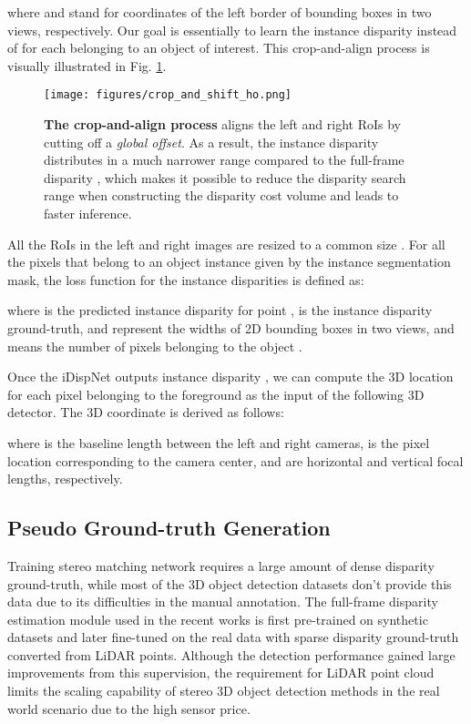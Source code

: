\documentclass[10pt,twocolumn,letterpaper]{article}
\begin{document}
where  and  stand for coordinates of the left border of bounding boxes in two views, respectively. Our goal is essentially to learn the instance disparity  instead of  for each  belonging to an object of interest. This crop-and-align process is visually illustrated in Fig. \ref{fig:crop_and_shift}.
\begin{figure}[tb]
    \centering
    \texttt{[image: figures/crop\_and\_shift\_ho.png]}
    \caption{
        \textbf{The crop-and-align process} aligns the left and right RoIs by cutting off a \textit{global offset}.
        As a result, the instance disparity  distributes in a much narrower range compared to the full-frame disparity , which makes it possible to reduce the disparity search range when constructing the disparity cost volume and leads to faster inference.
    }
    \label{fig:crop_and_shift}
\end{figure} 
All the RoIs in the left and right images are resized to a common size .
For all the pixels  that belong to an object instance  given by the instance segmentation mask, 
the loss function for the instance disparities is defined as:


where  is the predicted instance disparity for point ,  is the instance disparity ground-truth, 
 and  represent the widths of 2D bounding boxes in two views, and  means the number of pixels belonging to the object .

Once the iDispNet outputs instance disparity , we can compute the 3D location for each pixel  belonging to the foreground as the input of the following 3D detector.
The 3D coordinate  is derived as follows:


where  is the baseline length between the left and right cameras,
 is the pixel location corresponding to the camera center,
and  are horizontal and vertical focal lengths, respectively.

\subsection{Pseudo Ground-truth Generation}\label{sec:method-pseudo-gt}

Training stereo matching network requires a large amount of dense disparity ground-truth, while most of the 3D object detection datasets \cite{geigerAreWeReady2012, caesar2019nuscenes, sun2019scalability} don't provide this data due to its difficulties in the manual annotation.
The full-frame disparity estimation module used in the recent works \cite{wang2019pseudo,you2019pseudo}
is first pre-trained on synthetic datasets and later fine-tuned on the real data with sparse disparity ground-truth converted from LiDAR points.
Although the detection performance gained large improvements from this supervision, the requirement for LiDAR point cloud limits the scaling capability of stereo 3D object detection methods in the real world scenario due to the high sensor price.
\end{document}
